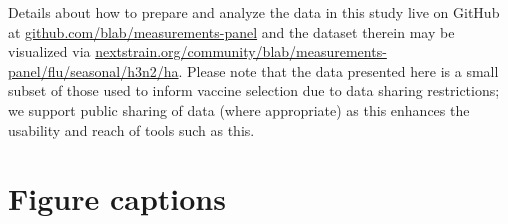 \documentclass[utf8]{FrontiersinHarvard} %
\begin{document}
Details about how to prepare and analyze the data in this study live on GitHub at \href{https://github.com/blab/measurements-panel/}{github.com/blab/measurements-panel} and the dataset therein may be visualized via \newline\href{https://nextstrain.org/community/blab/measurements-panel/flu/seasonal/h3n2/ha}{nextstrain.org/community/blab/measurements-panel/flu/seasonal/h3n2/ha}.
Please note that the data presented here is a small subset of those used to inform vaccine selection due to data sharing restrictions; we support public sharing of data (where appropriate) as this enhances the usability and reach of tools such as this.





\section*{Figure captions}

\end{document}
